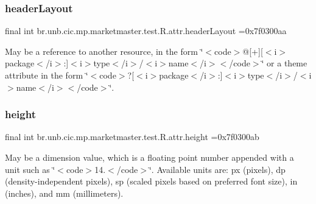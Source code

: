 \subsubsection{\texorpdfstring{header\+Layout}{headerLayout}}
{\footnotesize\ttfamily final int br.\+unb.\+cic.\+mp.\+marketmaster.\+test.\+R.\+attr.\+header\+Layout =0x7f0300aa\hspace{0.3cm}{\ttfamily [static]}}

May be a reference to another resource, in the form \char`\"{}$<$code$>$@\mbox{[}+\mbox{]}\mbox{[}$<$i$>$package$<$/i$>$\+:\mbox{]}$<$i$>$type$<$/i$>$/$<$i$>$name$<$/i$>$$<$/code$>$\char`\"{} or a theme attribute in the form \char`\"{}$<$code$>$?\mbox{[}$<$i$>$package$<$/i$>$\+:\mbox{]}$<$i$>$type$<$/i$>$/$<$i$>$name$<$/i$>$$<$/code$>$\char`\"{}. \mbox{\label{classbr_1_1unb_1_1cic_1_1mp_1_1marketmaster_1_1test_1_1R_1_1attr_a9faf2aab33f0791aa0a308c215445347}} 
\subsubsection{\texorpdfstring{height}{height}}
{\footnotesize\ttfamily final int br.\+unb.\+cic.\+mp.\+marketmaster.\+test.\+R.\+attr.\+height =0x7f0300ab\hspace{0.3cm}{\ttfamily [static]}}

May be a dimension value, which is a floating point number appended with a unit such as \char`\"{}$<$code$>$14.\+5sp$<$/code$>$\char`\"{}. Available units are\+: px (pixels), dp (density-\/independent pixels), sp (scaled pixels based on preferred font size), in (inches), and mm (millimeters). \mbox{\label{classbr_1_1unb_1_1cic_1_1mp_1_1marketmaster_1_1test_1_1R_1_1attr_addc6cee71ecb7c082c3dd64a6a170a06}} 
